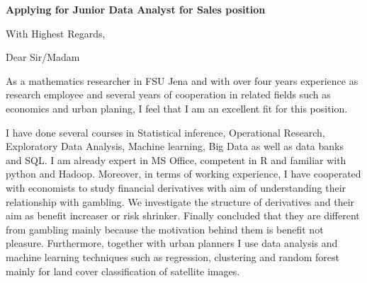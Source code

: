 \documentclass[12pt,a4paper,sans]{moderncv}        %
\title{}                               %
\begin{document}
\date{May 17, 2016}
\opening{\textbf{Applying for  Junior Data Analyst for Sales position}}
\closing{With Highest Regards,}
\makelettertitle

Dear Sir/Madam

As a mathematics researcher in FSU Jena and with over four years experience as research employee and several years of cooperation in related fields such as economics and urban planing, I feel that I am an excellent fit for this position.



I have done several courses in Statistical inference, Operational Research, Exploratory Data Analysis,  Machine learning, Big Data as well as data banks and SQL. I am already expert in MS Office, competent in R and familiar with python and Hadoop. %
Moreover, in terms of working experience, I have cooperated with economists to study financial derivatives with aim of understanding their relationship with gambling. We investigate the structure of derivatives and their aim as benefit increaser or risk shrinker. Finally concluded that they are different from gambling mainly because the motivation behind them is benefit not pleasure.   
Furthermore, together with urban planners I use data analysis and machine learning techniques such as regression, clustering and random forest mainly for land cover classification of satellite images.

\end{document}
